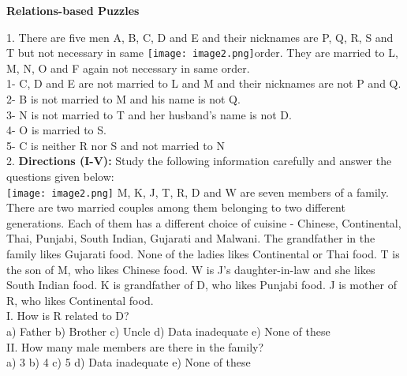 \documentclass[
]{article}
\author{}
\date{}
\begin{document}
	
 

\begin{center}
	{\Large \textbf{Relations-based Puzzles \\}}
\end{center}

1. There are five men A, B, C, D and E and their nicknames are P, Q, R, S and T but not
necessary in same \texttt{[image: image2.png]}order. They are married to L, M, N, O and F again not necessary in same
order.\\
1- C, D and E are not married to L and M and their nicknames are not P and Q.\\
2- B is not married to M and his name is not Q.\\
3- N is not married to T and her husband’s name is not D.\\
4- O is married to S.\\
5- C is neither R nor S and not married to N\\

2. \textbf{Directions (I-V):} Study the following information carefully and answer the questions given
below:\\
\texttt{[image: image2.png]}
M, K, J, T, R, D and W are seven members of a family. There are two married couples among
them belonging to two different generations. Each of them has a different choice of cuisine -
Chinese, Continental, Thai, Punjabi, South Indian, Gujarati and Malwani. The grandfather in
the family likes Gujarati food. None of the ladies likes Continental or Thai food. T is the son
of M, who likes Chinese food. W is J's daughter-in-law and she likes South Indian food. K is
grandfather of D, who likes Punjabi food. J is mother of R, who likes Continental food.\\

I. How is R related to D?\\
a) Father \hspace{2mm}b) Brother \hspace{2mm}c) Uncle
\hspace{2mm}d) Data inadequate \hspace{2mm}e) None of these\\

II. How many male members are there in the family?\\
a) 3 \hspace{2mm}b) 4 \hspace{2mm}c) 5
\hspace{2mm}d) Data inadequate \hspace{2mm}e) None of these\\
\end{document}
